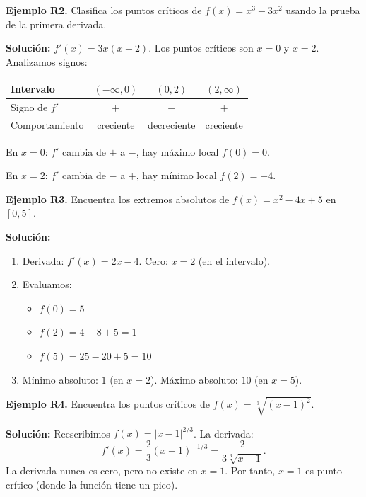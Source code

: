 \documentclass[12pt, letterpaper]{article}
\begin{document}
\textbf{Ejemplo R2.} Clasifica los puntos críticos de $f(x) = x^3 - 3x^2$ usando la prueba de la primera derivada.

\begin{cuadrosolucion}
  \textbf{Solución:} $f'(x) = 3x(x - 2)$. Los puntos críticos son $x = 0$ y $x = 2$. Analizamos signos:
  \begin{center}
    \small
    \begin{tabular}{lccc}
      \toprule
      \textbf{Intervalo} & $(-\infty, 0)$ & $(0, 2)$    & $(2, \infty)$ \\
      \midrule
      Signo de $f'$      & $+$            & $-$         & $+$           \\
      Comportamiento     & creciente      & decreciente & creciente     \\
      \bottomrule
    \end{tabular}
  \end{center}
  En $x = 0$: $f'$ cambia de $+$ a $-$, hay máximo local $f(0) = 0$.

  En $x = 2$: $f'$ cambia de $-$ a $+$, hay mínimo local $f(2) = -4$.
\end{cuadrosolucion}
\newpage
\textbf{Ejemplo R3.} Encuentra los extremos absolutos de $f(x) = x^2 - 4x + 5$ en $[0, 5]$.

\begin{cuadrosolucion}
  \textbf{Solución:}
  \begin{enumerate}
    \item Derivada: $f'(x) = 2x - 4$. Cero: $x = 2$ (en el intervalo).
    \item Evaluamos:
          \begin{itemize}
            \item $f(0) = 5$
            \item $f(2) = 4 - 8 + 5 = 1$
            \item $f(5) = 25 - 20 + 5 = 10$
          \end{itemize}
    \item Mínimo absoluto: $1$ (en $x = 2$). Máximo absoluto: $10$ (en $x = 5$).
  \end{enumerate}
\end{cuadrosolucion}

\textbf{Ejemplo R4.} Encuentra los puntos críticos de $f(x) = \sqrt[3]{(x - 1)^2}$.

\begin{cuadrosolucion}
  \textbf{Solución:} Reescribimos $f(x) = |x - 1|^{2/3}$. La derivada:
  $$f'(x) = \frac{2}{3}(x - 1)^{-1/3} = \frac{2}{3\sqrt[3]{x - 1}}.$$
  La derivada nunca es cero, pero no existe en $x = 1$. Por tanto, $x = 1$ es punto crítico (donde la función tiene un pico).
\end{cuadrosolucion}
\end{document}
